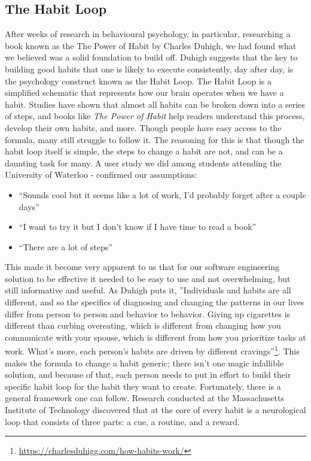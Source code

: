 \subsection{The Habit Loop}
After weeks of research in behavioural psychology, in particular, researching a book known as the The Power of Habit by Charles Duhigh, we had found what we believed was a solid foundation to build off. Duhigh suggests that the key to building good habits that one is likely to execute consistently, day after day, is the psychology construct known as the Habit Loop. The Habit Loop is a simplified schematic that represents how our brain operates when we have a habit. Studies have shown that almost all habits can be broken down into a series of steps, and books like \textit{The Power of Habit} help readers understand this process, develop their own habits, and more. Though people have easy access to the formula, many still struggle to follow it. The reasoning for this is that though the habit loop itself is simple, the steps to change a habit are not, and can be a daunting task for many. A user study we did among students attending the University of Waterloo - confirmed our assumptions:

\begin{itemize}
    \item “Sounds cool but it seems like a lot of work, I’d probably forget after a couple days”
    \item “I want to try it but I don’t know if I have time to read a book”
    \item “There are a lot of steps”
\end{itemize}

This made it become very apparent to us that for our software engineering solution to be effective it needed to be easy to use and not overwhelming, but still informative and useful. As Duhigh puts it, ”Individuals and habits are all different, and so the specifics of diagnosing and changing the patterns in our lives differ from person to person and behavior to behavior. Giving up cigarettes is different than curbing overeating, which is different from changing how you communicate with your spouse, which is different from how you prioritize tasks at work. What’s more, each person’s habits are driven by different cravings”\footnote{\url{https://charlesduhigg.com/how-habits-work/}}. This makes the formula to change a habit generic; there isn’t one magic infallible solution, and because of that, each person needs to put in effort to build their specific habit loop for the habit they want to create. Fortunately, there is a general framework one can follow. Research conducted at the Massachusetts Institute of Technology discovered that at the core of every habit is a neurological loop that consists of three parts: a cue, a routine, and a reward.

